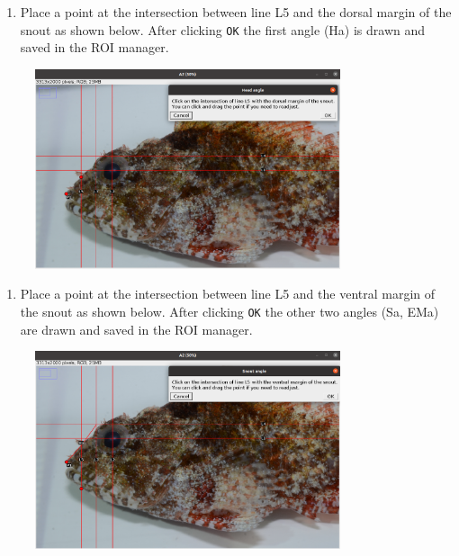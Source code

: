 \documentclass[
  letterpaper,
  DIV=11,
  numbers=noendperiod,
  oneside]{scrreprt}
\providecommand{\tightlist}{%
  \setlength{\itemsep}{0pt}\setlength{\parskip}{0pt}}\usepackage{longtable,booktabs,array}
\begin{document}
\begin{enumerate}
\def\labelenumi{\arabic{enumi}.}
\setcounter{enumi}{4}
\tightlist
\item
  Place a point at the intersection between line L5 and the dorsal
  margin of the snout as shown below. After clicking \texttt{OK} the
  first angle (Ha) is drawn and saved in the ROI manager.
\end{enumerate}

\begin{figure}

{\centering \includegraphics[width=0.8\textwidth,height=\textheight]{./images/screenshots/upper_L5_head.png}

}

\end{figure}

\begin{enumerate}
\def\labelenumi{\arabic{enumi}.}
\setcounter{enumi}{5}
\tightlist
\item
  Place a point at the intersection between line L5 and the ventral
  margin of the snout as shown below. After clicking \texttt{OK} the
  other two angles (Sa, EMa) are drawn and saved in the ROI manager.
\end{enumerate}

\begin{figure}

{\centering \includegraphics[width=0.8\textwidth,height=\textheight]{./images/screenshots/lower_L5_head.png}

}

\end{figure}
\end{document}
